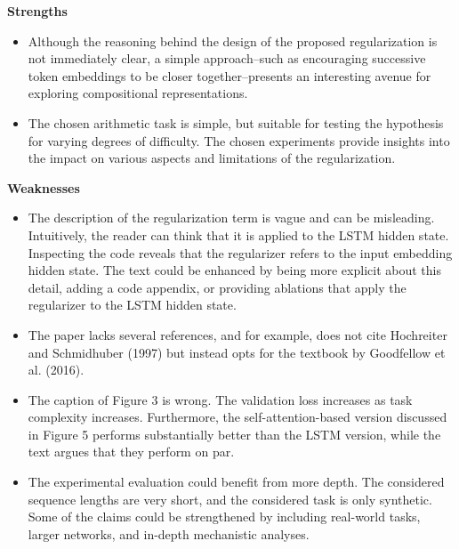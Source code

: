 \vspace{1em}

\textbf{Strengths}

\begin{itemize}
    \item Although the reasoning behind the design of the proposed regularization is not immediately clear, a simple approach--such as encouraging successive token embeddings to be closer together--presents an interesting avenue for exploring compositional representations.
    \item The chosen arithmetic task is simple, but suitable for testing the hypothesis for varying degrees of difficulty. The chosen experiments provide insights into the impact on various aspects and limitations of the regularization.
\end{itemize}



\textbf{Weaknesses}
\begin{itemize}
    \item The description of the regularization term is vague and can be misleading. Intuitively, the reader can think that it is applied to the LSTM hidden state. Inspecting the code reveals that the regularizer refers to the input embedding hidden state. The text could be enhanced by being more explicit about this detail, adding a code appendix, or providing ablations that apply the regularizer to the LSTM hidden state.
    \item The paper lacks several references, and for example, does not cite Hochreiter and Schmidhuber (1997) but instead opts for the textbook by Goodfellow et al. (2016).
    \item The caption of Figure 3 is wrong. The validation loss increases as task complexity increases. Furthermore, the self-attention-based version discussed in Figure 5 performs substantially better than the LSTM version, while the text argues that they perform on par.
    \item The experimental evaluation could benefit from more depth. The considered sequence lengths are very short, and the considered task is only synthetic. Some of the claims could be strengthened by including real-world tasks, larger networks, and in-depth mechanistic analyses.
\end{itemize}


